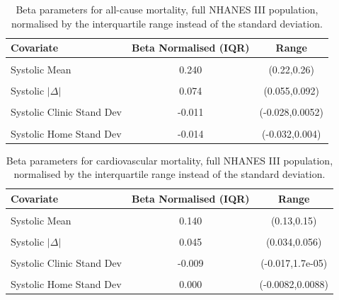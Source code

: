 \documentclass[
]{article}
\begin{document}
\begin{table}[!h]
\centering
\caption{\label{tab:iqrnormbetaRL1}Beta parameters for all-cause mortality, full NHANES III population, normalised by the interquartile range instead of the standard deviation.}
\centering
\begin{tabular}[t]{lcc}
\toprule
Covariate & Beta Normalised (IQR) & Range\\
\midrule
\cellcolor{gray!10}{Diastolic Mean} & \cellcolor{gray!10}{-0.077} & \cellcolor{gray!10}{(-0.097,-0.057)}\\
Systolic Mean & 0.240 & (0.22,0.26)\\
\cellcolor{gray!10}{Diastolic $|\Delta|$} & \cellcolor{gray!10}{0.052} & \cellcolor{gray!10}{(0.026,0.078)}\\
Systolic $|\Delta|$ & 0.074 & (0.055,0.092)\\
\cellcolor{gray!10}{Diastolic Clinic Stand Dev} & \cellcolor{gray!10}{-0.050} & \cellcolor{gray!10}{(-0.079,-0.022)}\\
Systolic Clinic Stand Dev & -0.011 & (-0.028,0.0052)\\
\cellcolor{gray!10}{Diastolic Home Stand Dev} & \cellcolor{gray!10}{0.019} & \cellcolor{gray!10}{(-0.0059,0.044)}\\
Systolic Home Stand Dev & -0.014 & (-0.032,0.004)\\
\bottomrule
\end{tabular}
\end{table}

\begin{table}[!h]
\centering
\caption{\label{tab:iqrnormbetaRL2}Beta parameters for cardiovascular mortality, full NHANES III population, normalised by the interquartile range instead of the standard deviation.}
\centering
\begin{tabular}[t]{lcc}
\toprule
Covariate & Beta Normalised (IQR) & Range\\
\midrule
\cellcolor{gray!10}{Diastolic Mean} & \cellcolor{gray!10}{-0.049} & \cellcolor{gray!10}{(-0.061,-0.038)}\\
Systolic Mean & 0.140 & (0.13,0.15)\\
\cellcolor{gray!10}{Diastolic $|\Delta|$} & \cellcolor{gray!10}{0.053} & \cellcolor{gray!10}{(0.038,0.068)}\\
Systolic $|\Delta|$ & 0.045 & (0.034,0.056)\\
\cellcolor{gray!10}{Diastolic Clinic Stand Dev} & \cellcolor{gray!10}{-0.019} & \cellcolor{gray!10}{(-0.034,-0.0044)}\\
Systolic Clinic Stand Dev & -0.009 & (-0.017,1.7e-05)\\
\cellcolor{gray!10}{Diastolic Home Stand Dev} & \cellcolor{gray!10}{0.012} & \cellcolor{gray!10}{(-6.0e-04,0.025)}\\
Systolic Home Stand Dev & 0.000 & (-0.0082,0.0088)\\
\bottomrule
\end{tabular}
\end{table}
\end{document}
